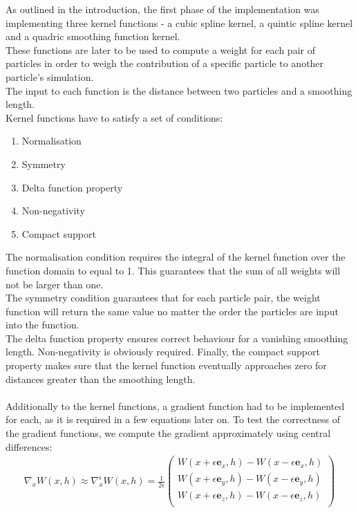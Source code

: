 \documentclass{ACGSeminar}
\begin{document}
As outlined in the introduction, the first phase of the implementation was implementing three kernel functions - a cubic spline kernel, a quintic spline kernel and a quadric smoothing function kernel. \\
These functions are later to be used to compute a weight for each pair of particles in order to weigh the contribution of a specific particle to another particle's simulation. \\
The input to each function is the distance between two particles and a smoothing length. \\
Kernel functions have to satisfy a set of conditions: \\
\begin{enumerate}
\item Normalisation
\item Symmetry
\item Delta function property
\item Non-negativity
\item Compact support
\end{enumerate}
The normalisation condition requires the integral of the kernel function over the function domain to equal to 1. This guarantees that the sum of all weights will not be larger than one. \\
The symmetry condition guarantees that for each particle pair, the weight function will return the same value no matter the order the particles are input into the function.\\
The delta function property ensures correct behaviour for a vanishing smoothing length.
Non-negativity is obviously required.
Finally, the compact support property makes sure that the kernel function eventually approaches zero for distances greater than the smoothing length.\\
\\
Additionally to the kernel functions, a gradient function had to be implemented for each, as it is required in a few equations later on.
To test the correctness of the gradient functions, we compute the gradient approximately using central differences:\\
\begin{equation} 
\begin{aligned}
\nabla_{x}W(x, h) \approx \nabla^{\epsilon}_{x} W(x, h) = \frac{1}{2\epsilon}\begin{pmatrix}
W(x + \epsilon\mathbf{e}_{x}, h) - W(x - \epsilon\mathbf{e}_{x}, h)\\ 
W(x + \epsilon\mathbf{e}_{y}, h) - W(x - \epsilon\mathbf{e}_{y}, h)\\ 
W(x + \epsilon\mathbf{e}_{z}, h) - W(x - \epsilon\mathbf{e}_{z}, h)\\ 
\end{pmatrix}
\end{aligned}
\end{equation}
\end{document}
